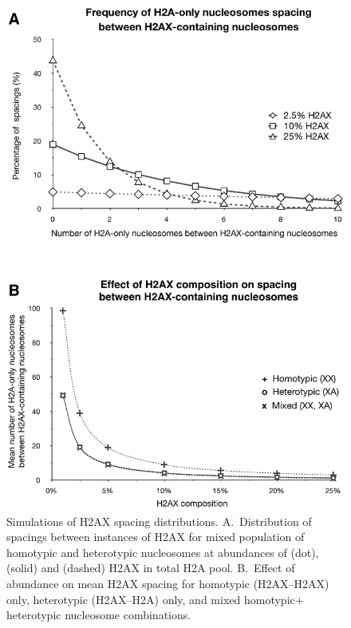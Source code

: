 \begin{figure}
\includegraphics[width=\textwidth]{h2ax-review/figs/Fig7}
\caption{Simulations of H2AX spacing distributions. A.~Distribution of spacings between instances of
H2AX for mixed population of homotypic and heterotypic nucleosomes at abundances of  (dot),
 (solid) and  (dashed) H2AX in total H2A pool. B.~Effect of abundance on mean H2AX spacing
for homotypic (H2AX--H2AX) only, heterotypic (H2AX--H2A) only, and mixed homotypic$+$heterotypic
nucleosome combinations.}
\label{fig:h2ax-review:H2AX-graphs}
\end{figure}

